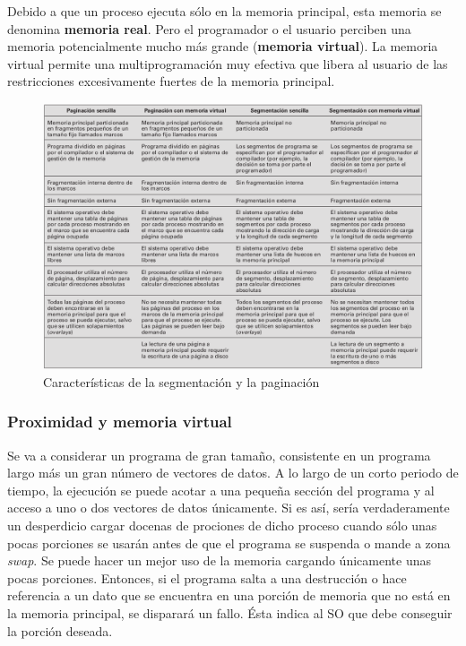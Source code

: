 \documentclass{article}
\begin{document}
		Debido a que un proceso ejecuta sólo en la memoria principal, esta memoria se denomina \textbf{memoria real}. Pero el programador o el usuario perciben una memoria potencialmente mucho más grande (\textbf{memoria virtual}). La memoria virtual permite una multiprogramación muy efectiva que libera al usuario de las restricciones excesivamente fuertes de la memoria principal.
		
		\begin{figure}
		\caption{Características de la segmentación y la paginación}
		\label{figura3.3:paginación y segmentación}
		\centering
		\includegraphics[width=1\textwidth, scale=1]{tema_3_figura3.png}
		\end{figure}
		
	\subsubsection{Proximidad y memoria virtual}
		Se va a considerar un programa de gran tamaño, consistente en un programa largo más un gran número de vectores de datos. A lo largo de un corto periodo de tiempo, la ejecución se puede acotar a una pequeña sección del programa y al acceso a uno o dos vectores de datos únicamente. Si es así, sería verdaderamente un desperdicio cargar docenas de prociones de dicho proceso cuando sólo unas pocas porciones se usarán antes de que el programa se suspenda o mande a zona \textit{swap}. Se puede hacer un mejor uso de la memoria cargando únicamente unas pocas porciones. Entonces, si el programa salta a una destrucción o hace referencia a un dato que se encuentra en una porción de memoria que no está en la memoria principal, se disparará un fallo. Ésta indica al SO que debe conseguir la porción deseada. \\
		
\end{document}
